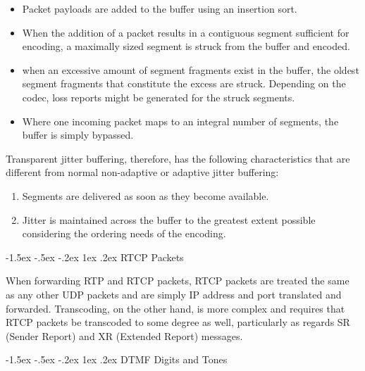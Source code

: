 \documentclass[letterpaper,final,notitlepage,twocolumn,10pt,twoside]{article}
\makeatletter
\let\normalsize = \small
\let\small = \footnotesize
\let\footnotesize = \scriptsize
\let\scriptsize = \tiny
\renewcommand\subsection{\@startsection{subsection}{2}{\z@}%
                                     {-1.5ex \@plus -.5ex \@minus -.2ex}%
                                     {1ex \@plus .2ex}%
                                     {\normalfont\normalsize\bfseries}}
\makeatother
\begin{document}
\begin{itemize}

\item Packet payloads are added to the buffer using an insertion sort.

\item When the addition of a packet results in a contiguous segment sufficient
for encoding, a maximally sized segment is struck from the buffer and encoded.

\item when an excessive amount of segment fragments exist in the buffer, the
oldest segment fragments that constitute the excess are struck.  Depending on
the codec, loss reports might be generated for the struck segments.

\item Where one incoming packet maps to an integral number of segments, the
buffer is simply bypassed.

\end{itemize}

Transparent jitter buffering, therefore, has the following characteristics that
are different from normal non-adaptive or adaptive jitter buffering:

\begin{enumerate}

\item Segments are delivered as soon as they become available.

\item Jitter is maintained across the buffer to the greatest extent possible
considering the ordering needs of the encoding.

\end{enumerate}

\subsection{RTCP Packets}

When forwarding RTP and RTCP packets, RTCP packets are treated the same as any
other UDP packets and are simply IP address and port translated and forwarded.
Transcoding, on the other hand, is more complex and requires that RTCP packets
be transcoded to some degree as well, particularly as regards SR (Sender Report)
and XR (Extended Report) messages.

\subsection{DTMF Digits and Tones}
\end{document}
